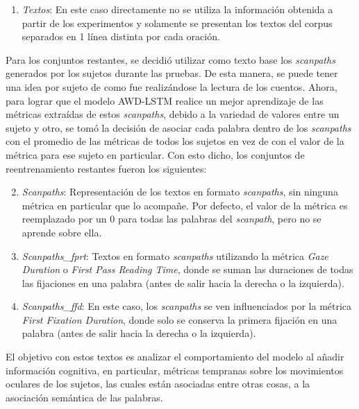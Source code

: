 \begin{enumerate}
    \item \textit{Textos}: En este caso directamente no se utiliza la información obtenida a partir de los experimentos y solamente se presentan los textos del corpus separados en 1 línea distinta por cada oración.
\end{enumerate}

Para los conjuntos restantes, se decidió utilizar como texto base los \textit{scanpaths} generados por los sujetos durante las pruebas. De esta manera, se puede tener una idea por sujeto de como fue realizándose la lectura de los cuentos. Ahora, para lograr que el modelo AWD-LSTM realice un mejor aprendizaje de las métricas extraídas de estos \textit{scanpaths}, debido a la variedad de valores entre un sujeto y otro, se tomó la decisión de asociar cada palabra dentro de los \textit{scanpaths} con el promedio de las métricas de todos los sujetos en vez de con el valor de la métrica para ese sujeto en particular. Con esto dicho, los conjuntos de reentrenamiento restantes fueron los siguientes:

\begin{enumerate}
    \setcounter{enumi}{1}
    \item \textit{Scanpaths}: Representación de los textos en formato \textit{scanpaths}, sin ninguna métrica en particular que lo acompañe. Por defecto, el valor de la métrica es reemplazado por un 0 para todas las palabras del \textit{scanpath}, pero no se aprende sobre ella.
    \item \textit{Scanpaths\_fprt}: Textos en formato \textit{scanpaths} utilizando la métrica \textit{Gaze Duration} o \textit{First Pass Reading Time}, donde se suman las duraciones de todas las fijaciones en una palabra (antes de salir hacia la derecha o la izquierda).
    \item \textit{Scanpaths\_ffd}: En este caso, los \textit{scanpaths} se ven influenciados por la métrica \textit{First Fixation Duration}, donde solo se conserva la primera fijación en una palabra (antes de salir hacia la derecha o la izquierda).
\end{enumerate}

El objetivo con estos textos es analizar el comportamiento del modelo al añadir información cognitiva, en particular, métricas tempranas sobre los movimientos oculares de los sujetos, las cuales están asociadas entre otras cosas, a la asociación semántica de las palabras.





